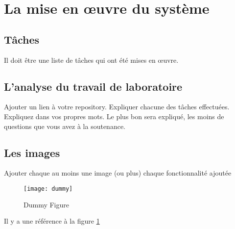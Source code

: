 \section{La mise en œuvre du système}

\subsection{Tâches}

Il doit être une liste de tâches qui ont été mises en œuvre.

\subsection{L'analyse du travail de laboratoire}

Ajouter un lien à votre repository.
Expliquer chacune des tâches effectuées. Expliquez dans vos propres mots. Le plus bon sera expliqué,
les moins de questions que vous avez à la soutenance.

\subsection{Les images}

Ajouter chaque au moins une image (ou plus) chaque fonctionnalité ajoutée
\begin{figure}[!ht]
\centering
\texttt{[image: dummy]}
\caption{Dummy Figure}\label{dummy}
\end{figure}

Il y a une référence à la figure \ref{dummy}

\clearpage
